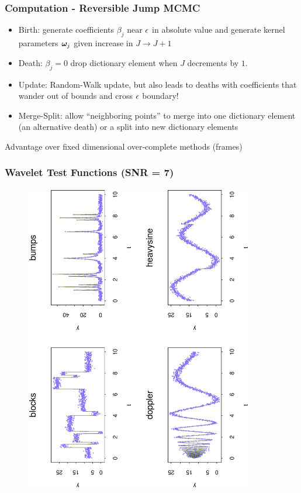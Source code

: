 \documentclass[]{beamer}
\newcommand{\bs}[2]{\begin{frame} \frametitle{#1}
{#2}
\end{frame} }
\begin{document}
\bs{Computation - Reversible Jump MCMC} {

  \begin{itemize}
  \item Birth: generate coefficients $\beta_j$ near $\epsilon$ in absolute value
    and generate kernel parameters $\bm \omega_j$ given increase in $J
    \to J+1$ \pause
\item Death: $\beta_j = 0$  drop dictionary element when $J$
  decrements by $1$.  \pause
\item Update:  Random-Walk update, but also leads to deaths with
  coefficients that wander out of bounds and cross $\epsilon$
  boundary! \pause
\item Merge-Split: allow ``neighboring points'' to merge into one
  dictionary element (an alternative death) or a split into  new
  dictionary elements \pause
  \end{itemize}
Advantage over fixed dimensional over-complete methods (frames)

}


\bs{Wavelet Test Functions (SNR = 7)} {
\begin{figure}[!h]
  \begin{center}
    \includegraphics[angle=270,origin=l,totalheight=6truecm,
     clip=1,width=10cm]{wavedata.ps}
  \end{center}
\end{figure}
}
\end{document}
